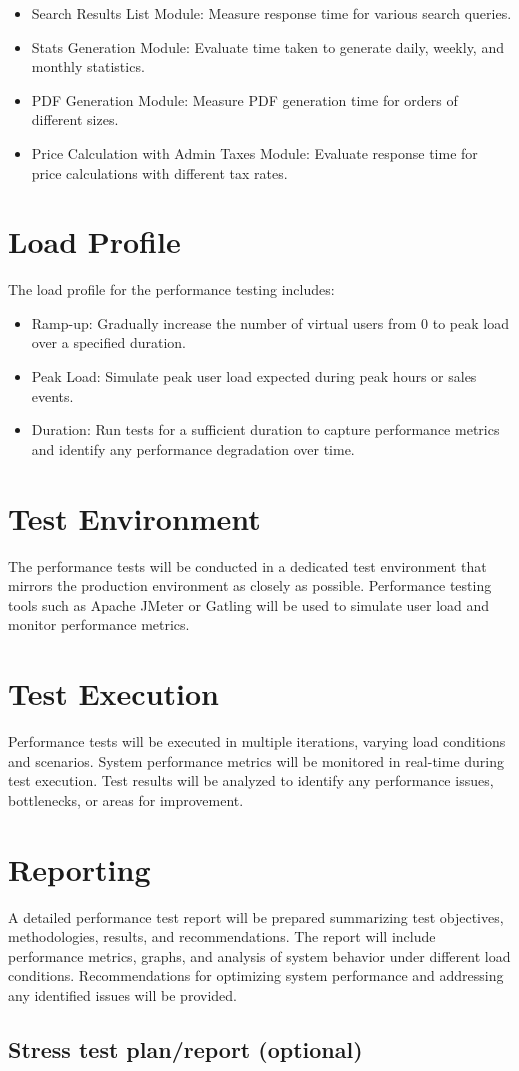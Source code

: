 \documentclass{article}
\begin{document}
\begin{itemize}
  \item Search Results List Module: Measure response time for various search queries.
  \item Stats Generation Module: Evaluate time taken to generate daily, weekly, and monthly statistics.
  \item PDF Generation Module: Measure PDF generation time for orders of different sizes.
  \item Price Calculation with Admin Taxes Module: Evaluate response time for price calculations with different tax rates.
\end{itemize}

\section*{Load Profile}
The load profile for the performance testing includes:

\begin{itemize}
  \item Ramp-up: Gradually increase the number of virtual users from 0 to peak load over a specified duration.
  \item Peak Load: Simulate peak user load expected during peak hours or sales events.
  \item Duration: Run tests for a sufficient duration to capture performance metrics and identify any performance degradation over time.
\end{itemize}

\section*{Test Environment}
The performance tests will be conducted in a dedicated test environment that mirrors the production environment as closely as possible. Performance testing tools such as Apache JMeter or Gatling will be used to simulate user load and monitor performance metrics.

\section*{Test Execution}
Performance tests will be executed in multiple iterations, varying load conditions and scenarios. System performance metrics will be monitored in real-time during test execution. Test results will be analyzed to identify any performance issues, bottlenecks, or areas for improvement.

\section*{Reporting}
A detailed performance test report will be prepared summarizing test objectives, methodologies, results, and recommendations. The report will include performance metrics, graphs, and analysis of system behavior under different load conditions. Recommendations for optimizing system performance and addressing any identified issues will be provided.
\subsection{Stress test plan/report (optional)}
\end{document}
